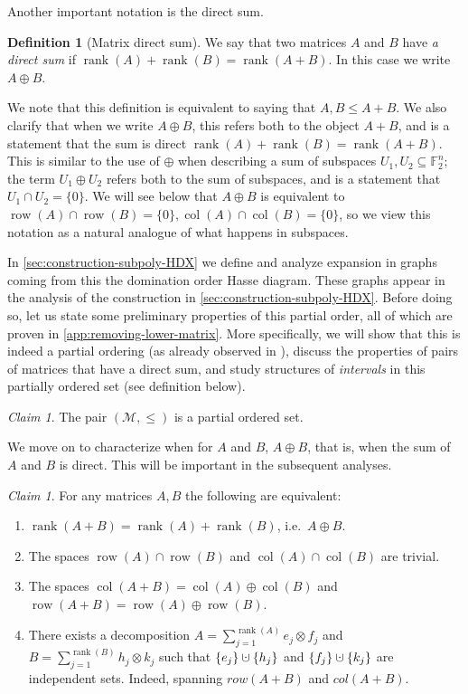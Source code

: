 \documentclass[10pt,a4paper]{article}
\newcommand{\prettyref}[1]{\cref{#1}}
\theoremstyle{definition}
\newtheorem{definition}[theorem]{Definition}
\theoremstyle{remark}
\newtheorem{claim}[theorem]{Claim}
\newcommand{\set}[1]{\{#1\}}
\newcommand{\F}{\mathbb{F}}
\DeclareMathOperator{\rank}{rank}
\DeclareMathOperator{\row}{row}
\DeclareMathOperator{\col}{col}
\renewcommand{\leq}{\leqslant}
\numberwithin{equation}{section}
\newcommand{\dunion}{\mathbin{\mathaccent\cdot\cup}}
\let\pref=\prettyref
\def\MP{\mathcal{M}}
\begin{document}
Another important notation is the direct sum.
\begin{definition}[Matrix direct sum]
    We say that two matrices \(A\) and \(B\) have \emph{a direct sum} if \(\rank(A) + \rank(B) = \rank(A+B)\). In this case we write \(A \oplus B\).
\end{definition}
We note that this definition is equivalent to saying that \(A,B \leq A+B\).
We also clarify that when we write \(A \oplus B\), this refers both to the object \(A+B\), and is a statement that the sum is direct \(\rank(A) + \rank(B) = \rank(A+B)\). This is similar to the use of \(\oplus\) when describing a sum of subspaces \(U_1,U_2 \subseteq \F_2^n\); the term \(U_1 \oplus U_2\) refers both to the sum of subspaces, and is a statement that \(U_1 \cap U_2 = \set{0}\). We will see below that \(A \oplus B\) is equivalent to \(\row(A) \cap \row(B) = \set{0}, \col(A) \cap \col(B)= \set{0}\), so we view this notation as a natural analogue of what happens in subspaces.

In \pref{sec:construction-subpoly-HDX} we define and analyze expansion in graphs coming from this the domination order Hasse diagram. These graphs appear in the analysis of the construction in \pref{sec:construction-subpoly-HDX}. Before doing so, let us state some preliminary properties of this partial order, all of which are proven in \pref{app:removing-lower-matrix}. More specifically, we will show that this is indeed a partial ordering (as already observed in \cite{Golowich2023}), discuss the properties of pairs of matrices that have a direct sum, and study structures of \emph{intervals} in this partially ordered set (see definition below). %

\begin{claim} \label{claim:domination-is-partial-order}
    The pair \((\MP,\leq)\) is a partial ordered set. %
\end{claim}

We move on to characterize when for \(A\) and \(B\), \(A \oplus B\), that is, when the sum of \(A\) and \(B\) is direct. This will be important in the subsequent analyses.
\begin{claim} \label{claim:trivially-intersecting spaces}
    For any matrices \(A,B\) the following are equivalent:
    \begin{enumerate}
        \item \(\rank(A+B) = \rank(A) + \rank(B)\), i.e.\ \(A \oplus B\).
        \item The spaces \(\row(A) \cap \row(B)\) and \(\col(A) \cap \col(B)\) are trivial.
        \item The spaces \(\col(A+B) = \col(A) \oplus \col(B)\) and \(\row(A+B) = \row(A) \oplus \row(B)\).
        \item There exists a decomposition \(A = \sum_{j=1}^{\rank(A)} e_j \otimes f_j\) and \(B = \sum_{j=1}^{\rank(B)}h_j \otimes k_j\) such that \(\set{e_j} \dunion \set{h_j}\) and \(\set{f_j} \dunion \set{k_j}\) are independent sets. Indeed, spanning \(row(A+B)\) and \(col(A+B)\).
    \end{enumerate}
\end{claim}
\end{document}
